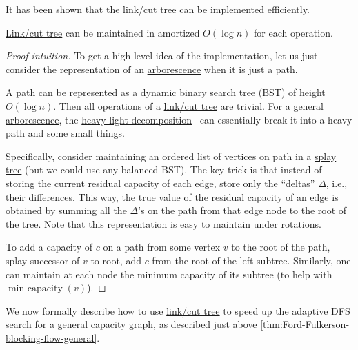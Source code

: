 It has been shown that the \hyperref[def:link-cut-tree]{link/cut tree} can be implemented efficiently.

\begin{theorem}\label{thm:link-cut-tree}
	\hyperref[def:link-cut-tree]{Link/cut tree} can be maintained in amortized \(O(\log n)\) for each operation.
\end{theorem}
\begin{proof}[Proof intuition]
	To get a high level idea of the implementation, let us just consider the representation of an \hyperref[def:arborescence]{arborescence} when it is just a path.

	\begin{intuition}
		A path can be represented as a dynamic binary search tree (BST) of height \(O(\log n)\). Then all operations of a \hyperref[def:link-cut-tree]{link/cut tree} are trivial. For a general \hyperref[def:arborescence]{arborescence}, the \href{https://en.wikipedia.org/wiki/Heavy-light_decomposition}{heavy light decomposition}~\cite{dominic1983data} can essentially break it into a heavy path and some small things.
	\end{intuition}

	Specifically, consider maintaining an ordered list of vertices on path in a \href{https://en.wikipedia.org/wiki/Splay_tree}{splay tree} (but we could use any balanced BST). The key trick is that instead of storing the current residual capacity of each edge, store only the ``deltas'' \(\Delta \), i.e., their differences. This way, the true value of the residual capacity of an edge is obtained by summing all the \(\Delta \)'s on the path from that edge node to the root of the tree. Note that this representation is easy to maintain under rotations.

	To add a capacity of \(c\) on a path from some vertex \(v\) to the root of the path, splay successor of \(v\) to root, add \(c\) from the root of the left subtree. Similarly, one can maintain at each node the minimum capacity of its subtree (to help with \(\operatorname{min-capacity}(v) \)).
\end{proof}

We now formally describe how to use \hyperref[def:link-cut-tree]{link/cut tree} to speed up the adaptive DFS search for a general capacity graph, as described just above \autoref{thm:Ford-Fulkerson-blocking-flow-general}.

